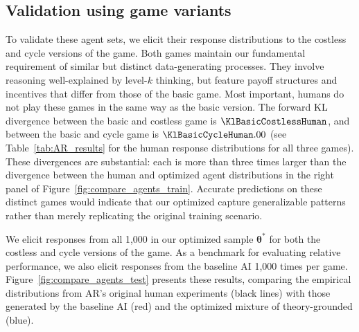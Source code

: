 \subsection{Validation using game variants}

To validate these agent sets, we elicit their response distributions to the costless and cycle versions of the game.
Both games maintain our fundamental requirement of similar but distinct data-generating processes. 
They involve reasoning well-explained by level-$k$ thinking, but feature payoff structures and incentives that differ from those of the basic game.
Most important, humans do not play these games in the same way as the basic version.
The forward KL divergence between the basic and costless game is $\KlBasicCostlessHuman$, and between the basic and cycle game is $\KlBasicCycleHuman.00$ (see Table~\ref{tab:AR_results} for the human response distributions for all three games).
These divergences are substantial: each is more than three times larger than the divergence between the human and optimized agent distributions in the right panel of Figure~\ref{fig:compare_agents_train}.
Accurate predictions on these distinct games would indicate that our optimized  capture generalizable patterns rather than merely replicating the original training scenario.

We elicit responses from all 1,000  in our optimized sample $\bm{\theta}^*$ for both the costless and cycle versions of the game. As a benchmark for evaluating relative performance, we also elicit responses from the baseline AI 1,000 times per game. 
Figure~\ref{fig:compare_agents_test} presents these results, comparing the empirical distributions from AR's original human experiments (black lines) with those generated by the baseline AI (red) and the optimized mixture of theory-grounded  (blue).

